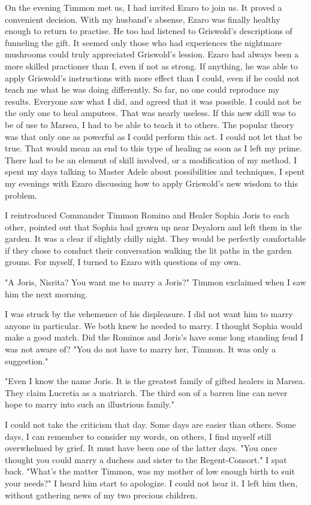 \documentclass{article}
\begin{document}
On the evening Timmon met us, I had invited Ezaro to join us. It proved a convenient decision. With my husband's absense, Ezaro was finally healthy enough to return to practise. He too had listened to Griswold's descriptions of funneling the gift. It seemed only those who had experiences the nightmare mushrooms could truly appreciated Griswold's lession. Ezaro had always been a more skilled practioner than I, even if not as strong. If anything, he was able to apply Griswold's instructions with more effect than I could, even if he could not teach me what he was doing differently. So far, no one could reproduce my results. Everyone saw what I did, and agreed that it was possible. I could not be the only one to heal amputees. That was nearly useless. If this new skill was to be of use to Marsea, I had to be able to teach it to others. The popular theory was that only one as powerful as I could perform this act. I could not let that be true. That would mean an end to this type of healing as soon as I left my prime. There had to be an element of skill involved, or a modification of my method. I spent my days talking to Master Adele about possibilities and techniques, I spent my evenings with Ezaro discussing how to apply Griswold's new wisdom to this problem.

I reintroduced Commander Timmon Romino and Healer Sophia Joris to each other, pointed out that Sophia had grown up near Deyalorn and left them in the garden. It was a clear if slightly chilly night. They would be perfectly comfortable if they chose to conduct their conversation walking the lit paths in the garden grouns. For myself, I turned to Ezaro with questions of my own.

"A Joris, Nisrita? You want me to marry a Joris?" Timmon exclaimed when I saw him the next morning. 

I was struck by the vehemence of his displeasure. I did not want him to marry anyone in particular. We both knew he needed to marry. I thought Sophia would make a good match. Did the Rominos and Joris's have some long standing feud I was not aware of? "You do not have to marry her, Timmon. It was only a suggestion."

"Even I know the name Joris. It is the greatest family of gifted healers in Marsea. They claim Lucretia as a matriarch. The third son of a barren line can never hope to marry into such an illustrious family." 

I could not take the criticism that day. Some days are easier than others. Some days, I can remember to consider my words, on others, I find myself still overwhelmed by grief. It must have been one of the latter days. "You once thought you could marry a duchess and sister to the Regent-Consort." I spat back. "What's the matter Timmon, was my mother of low enough birth to suit your needs?" I heard him start to apologize. I could not hear it. I left him then, without gathering news of my two precious children. 
\end{document}
